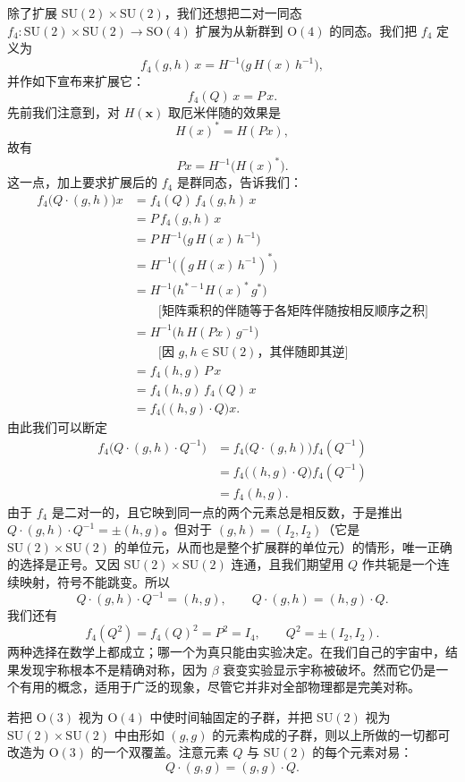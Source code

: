 除了扩展 $\mathrm{SU}(2)\times\mathrm{SU}(2)$，我们还想把二对一同态 $f_4:\mathrm{SU}(2)\times\mathrm{SU}(2)\to\mathrm{SO}(4)$ 扩展为从新群到 $\mathrm{O}(4)$ 的同态。我们把 $f_4$ 定义为
\[
f_4(g,h)\,x=H^{-1}\!\big(g\,H(x)\,h^{-1}\big),
\]
并作如下宣布来扩展它：
\[
f_4(Q)\,x=P\,x .
\]
先前我们注意到，对 $H(\mathbf{x})$ 取厄米伴随的效果是
\[
H(x)^*=H(Px),
\]
故有
\[
Px=H^{-1}\!\big(H(x)^*\big).
\]
这一点，加上要求扩展后的 $f_4$ 是群同态，告诉我们：
\begin{align*}
f_4\big(Q\cdot(g,h)\big)x
&=f_4(Q)\,f_4(g,h)\,x\\
&=P\,f_4(g,h)\,x\\
&=P\,H^{-1}\!\big(g\,H(x)\,h^{-1}\big)\\
&=H^{-1}\!\big((g\,H(x)\,h^{-1})^*\big)\\
&=H^{-1}\!\big(h^{*-1}H(x)^*\,g^*\big)\\
&\qquad\text{[矩阵乘积的伴随等于各矩阵伴随按相反顺序之积]}\\
&=H^{-1}\!\big(h\,H(Px)\,g^{-1}\big)\\
&\qquad\text{[因 $g,h\in\mathrm{SU}(2)$，其伴随即其逆]}\\
&=f_4(h,g)\,P\,x\\
&=f_4(h,g)\,f_4(Q)\,x\\
&=f_4\big((h,g)\cdot Q\big)x .
\end{align*}
由此我们可以断定
\begin{align*}
f_4\big(Q\cdot(g,h)\cdot Q^{-1}\big)
&=f_4\big(Q\cdot(g,h)\big)f_4(Q^{-1})\\
&=f_4\big((h,g)\cdot Q\big)f_4(Q^{-1})\\
&=f_4(h,g).
\end{align*}
由于 $f_4$ 是二对一的，且它映到同一点的两个元素总是相反数，于是推出 $Q\cdot(g,h)\cdot Q^{-1}=\pm(h,g)$。但对于 $(g,h)=(I_2,I_2)$（它是 $\mathrm{SU}(2)\times\mathrm{SU}(2)$ 的单位元，从而也是整个扩展群的单位元）的情形，唯一正确的选择是正号。又因 $\mathrm{SU}(2)\times\mathrm{SU}(2)$ 连通，且我们期望用 $Q$ 作共轭是一个连续映射，符号不能跳变。所以
\begin{equation}
Q\cdot(g,h)\cdot Q^{-1}=(h,g),\qquad
Q\cdot(g,h)=(h,g)\cdot Q . \tag{4.2.3}
\end{equation}
我们还有
\[
f_4(Q^2)=f_4(Q)^2=P^2=I_4,\qquad Q^2=\pm(I_2,I_2).
\]
两种选择在数学上都成立；哪一个为真只能由实验决定。在我们自己的宇宙中，结果发现宇称根本不是精确对称，因为 $\beta$ 衰变实验显示宇称被破坏。然而它仍是一个有用的概念，适用于广泛的现象，尽管它并非对全部物理都是完美对称。

若把 $\mathrm{O}(3)$ 视为 $\mathrm{O}(4)$ 中使时间轴固定的子群，并把 $\mathrm{SU}(2)$ 视为 $\mathrm{SU}(2)\times\mathrm{SU}(2)$ 中由形如 $(g,g)$ 的元素构成的子群，则以上所做的一切都可改造为 $\mathrm{O}(3)$ 的一个双覆盖。注意元素 $Q$ 与 $\mathrm{SU}(2)$ 的每个元素对易：
\[
Q\cdot(g,g)=(g,g)\cdot Q .
\]


